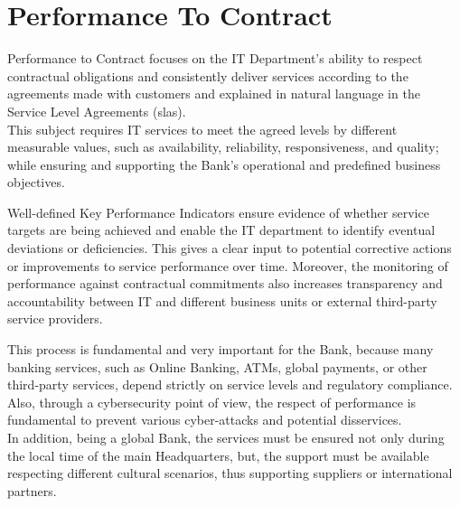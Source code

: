 
\section{Performance To Contract}
\label{subs:performancetocontract}

Performance to Contract focuses on the IT Department's ability to respect contractual obligations and consistently deliver services according to the agreements made with customers and explained in natural language in the Service Level Agreements (\gls{sla}s). \\

This subject requires IT services to meet the agreed levels by different measurable values, such as availability, reliability, responsiveness, and quality; while ensuring and supporting the Bank's operational and predefined business objectives.


    

Well-defined Key Performance Indicators ensure evidence of whether service targets are being achieved and enable the IT department to identify eventual deviations or deficiencies. This gives a clear input to potential corrective actions or improvements to service performance over time. Moreover, the monitoring of performance against contractual commitments also increases transparency and accountability between IT and different business units or external third-party service providers.


This process is fundamental and very important for the Bank, because many banking services, such as Online Banking, ATMs, global payments, or other third-party services, depend strictly on service levels and regulatory compliance. Also, through a cybersecurity point of view, the respect of performance is fundamental to prevent various cyber-attacks and potential disservices.\\
In addition, being a global Bank, the services must be ensured not only during the local time of the main Headquarters, but, the support must be available respecting different cultural scenarios, thus supporting suppliers or international partners.

